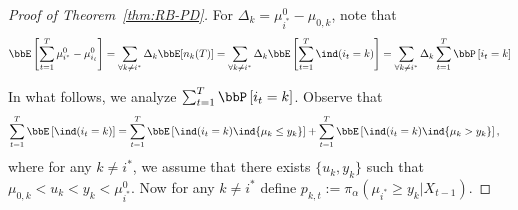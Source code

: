 \documentclass[11pt]{article}
\begin{document}
\begin{proof}[Proof of Theorem~\ref{thm:RB-PD}]
    For $\Delta_k = \mu^0_{i^*} -  \mu_{0,k}$, note that
    \begin{align}
        \bbE  \left[ \sum_{t=1}^{T}\mu^0_{i^*} -  \mu^0_{i_t}  \right] = \sum_{\forall k \neq i^*}  \Delta_k \bbE[n_{k}(T)] = \sum_{\forall k \neq i^*}  \Delta_k \bbE\left[\sum_{t=1}^{T}\ind( i_t=k )\right] = \sum_{\forall k \neq i^*}  \Delta_k  \sum_{t=1}^{T}\bbP\left[ i_t=k \right]
        \label{eq:MA20}
    \end{align}
    
    In what follows, we analyze $\sum_{t=1}^{T}\bbP\left[ i_t=k \right]$. Observe that
    \begin{align} 
        \sum_{t=1}^{T} \bbE\left[  \ind(i_t=k )\right] &=  \sum_{t=1}^{T} \bbE\left[  \ind(i_t=k )  \ind\{\mu_k \leq y_k  \}   \right] + \sum_{t=1}^{T} \bbE\left[  \ind(i_t=k )  \ind\{\mu_k > y_k  \}   \right],
        \label{eq:MA21}
        \end{align}
        where for any $k\neq i^*$, we assume that there exists $\{u_k,y_k\}$ such that $\mu_{0,k} < u_k < y_k < \mu^0_{i^*}$. Now for any $k \neq i^*$ define $p_{k,t}:= \pi_{\alpha}( \mu_{i^*} \geq y_k | X_{t-1} )$.

    


\end{proof}
\end{document}
